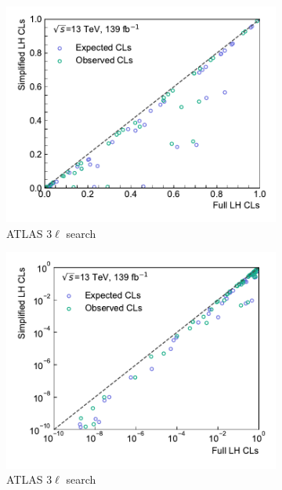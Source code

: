 \begin{figure}
\begin{subfigure}[b]{0.5\textwidth}
		\centering\includegraphics[width=\textwidth]{cls_scatter_3Loffshell_lin}
		\caption{ATLAS $3\ell$ search}
	\end{subfigure}\hfill
	\begin{subfigure}[b]{0.5\textwidth}
		\centering\includegraphics[width=\textwidth]{cls_scatter_3Loffshell_log}
		\caption{ATLAS $3\ell$ search}
	\end{subfigure}\hfill
	\begin{subfigure}[b]{0.5\textwidth}

\end{subfigure}
\end{figure}
